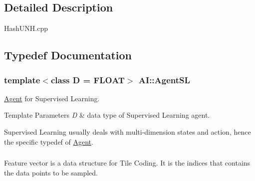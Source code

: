 \subsection{Detailed Description}
Hash\+U\+N\+H.\+cpp 

\subsection{Typedef Documentation}
\hypertarget{namespaceAI_acd3da5a0aa6fc3b0e9988d4a6251bdbd}{
\subsubsection[{Agent\+S\+L}]{\setlength{\rightskip}{0pt plus 5cm}template$<$class D  = F\+L\+O\+A\+T$>$ {\bf A\+I\+::\+Agent\+S\+L}}}\label{namespaceAI_acd3da5a0aa6fc3b0e9988d4a6251bdbd}


\hyperlink{classAI_1_1Agent}{Agent} for Supervised Learning. 


\begin{DoxyTemplParams}{Template Parameters}
{\em D} & data type of Supervised Learning agent.\\
\hline
\end{DoxyTemplParams}
Supervised Learning usually deals with multi-\/dimension states and action, hence the specific typedef of \hyperlink{classAI_1_1Agent}{Agent}. \hypertarget{namespaceAI_a23a39e1b301a5c1345fa508796940631}{
\subsubsection[{F\+E\+A\+T\+U\+R\+E\+\_\+\+V\+E\+C\+T\+O\+R}]{}}\label{namespaceAI_a23a39e1b301a5c1345fa508796940631}
Feature vector is a data structure for Tile Coding. It is the indices that contains the data points to be sampled. 